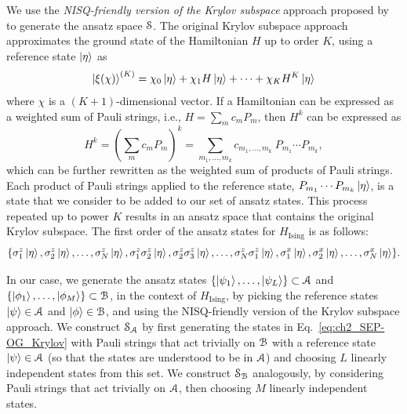 We use the \emph{NISQ-friendly version of the Krylov subspace} approach proposed by~\cite{bharti2022noisy} to generate the ansatz space $\mathcal{S}$.
The original Krylov subspace approach approximates the ground state of the Hamiltonian $H$ up to order $K$, using a reference state $\ket{\eta}$ as 
\begin{equation}
    \ket{\xi(\chi)}^{(K)} = \chi_0 \ket{\eta} + \chi_1 H \ket{\eta} + \dots + \chi_K H^K \ket{\eta} 
\end{equation} 
where $\chi$ is a $(K+1)$-dimensional vector.
If a Hamiltonian can be expressed as a weighted sum of Pauli strings, i.e., $H = \sum_m c_m P_m$, then $H^k$ can be expressed as 
\begin{equation} 
H^k = \left( \sum_m c_m P_m \right)^k = \sum_{m_1, \dots, m_k} c_{m_1, \dots, m_k}\ P_{m_1} \cdots P_{m_k}, 
\end{equation} 
which can be further rewritten as the weighted sum of products of Pauli strings.
Each product of Pauli strings applied to the reference state, $P_{m_1} \cdots P_{m_k}\ket{\eta}$, is a state that we consider to be added to our set of ansatz states. 
This process repeated up to power $K$ results in an ansatz space that contains the original Krylov subspace. 
The first order of the ansatz states for $H_{\mathrm{Ising}}$ is as follows: 
\begin{equation}
    \label{eq:ch2_SEP-OG_Krylov}
    \{\sigma_1^z \ket{\eta}, \sigma_2^z \ket{\eta}, \dots, \sigma_N^z \ket{\eta}, 
                    \sigma_1^z \sigma_2^z \ket{\eta}, \sigma_2^z \sigma_3^z \ket{\eta}, \dots, \sigma_N^z \sigma_1^z \ket{\eta},
                    \sigma_1^x \ket{\eta}, \sigma_2^x \ket{\eta}, \dots, \sigma_N^x \ket{\eta}\}.
\end{equation}
  
In our case, we generate the ansatz states $\{\ket{\psi_1}, \dots, \ket{\psi_L}\} \subset \mathcal{A}$ and $\{\ket{\phi_1}, \dots, \ket{\phi_M}\} \subset \mathcal{B}$, in the context of $H_{\mathrm{Ising}}$, by picking the reference states $\ket{\psi} \in \mathcal{A}$ and $\ket{\phi} \in \mathcal{B}$, and using the NISQ-friendly version of the Krylov subspace approach. 
We construct $\mathcal{S}_{\mathcal{A}}$ by first generating the states in Eq.~\eqref{eq:ch2_SEP-OG_Krylov} with Pauli strings that act trivially on $\mathcal{B}$ with a reference state $\ket{\psi} \in \mathcal{A}$ (so that the states are understood to be in $\mathcal{A}$) and choosing $L$ linearly independent states from this set. 
We construct $\mathcal{S}_{\mathcal{B}}$ analogously, by considering Pauli strings that act trivially on $\mathcal{A}$, then choosing $M$ linearly independent states.

